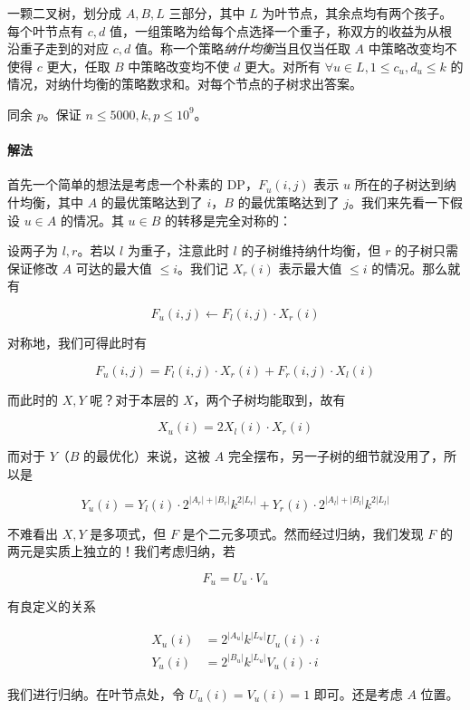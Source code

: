 \documentclass[12pt]{ctexart}
\theoremstyle{theorem}
\theoremstyle{theorem}
\begin{document}
一颗二叉树，划分成 $A,B,L$ 三部分，其中 $L$ 为叶节点，其余点均有两个孩子。每个叶节点有 $c,d$ 值，一组策略为给每个点选择一个重子，称双方的收益为从根沿重子走到的对应 $c,d$ 值。称一个策略\emph{纳什均衡}当且仅当任取 $A$ 中策略改变均不使得 $c$ 更大，任取 $B$ 中策略改变均不使 $d$ 更大。对所有 $\forall u\in L,1\le c_u,d_u\le k$ 的情况，对纳什均衡的策略数求和。对每个节点的子树求出答案。

同余 $p$。保证 $n\le 5000, k,p\le 10^9$。

\paragraph{解法}

首先一个简单的想法是考虑一个朴素的 DP，$F_u(i, j)$ 表示 $u$ 所在的子树达到纳什均衡，其中 $A$ 的最优策略达到了 $i$，$B$ 的最优策略达到了 $j$。我们来先看一下假设 $u\in A$ 的情况。其 $u\in B$ 的转移是完全对称的：

设两子为 $l, r$。若以 $l$ 为重子，注意此时 $l$ 的子树维持纳什均衡，但 $r$ 的子树只需保证修改 $A$ 可达的最大值 $\le i$。我们记 $X_r(i)$ 表示最大值 $\le i$ 的情况。那么就有

$$
F_u(i,j) \leftarrow F_l(i,j) \cdot X_r(i)
$$

对称地，我们可得此时有

$$
F_u(i,j) = F_l(i,j) \cdot X_r(i) + F_r(i,j) \cdot X_l(i)
$$

而此时的 $X,Y$ 呢？对于本层的 $X$，两个子树均能取到，故有

$$
X_u(i) = 2X_l(i)\cdot X_r(i)
$$

而对于 $Y$（$B$ 的最优化）来说，这被 $A$ 完全摆布，另一子树的细节就没用了，所以是

$$
Y_u(i) = Y_l(i) \cdot 2^{|A_r|+|B_r|}k^{2|L_r|} + Y_r(i) \cdot 2^{|A_l|+|B_l|}k^{2|L_l|}
$$

不难看出 $X,Y$ 是多项式，但 $F$ 是个二元多项式。然而经过归纳，我们发现 $F$ 的两元是实质上独立的！我们考虑归纳，若

$$
F_u = U_u \cdot V_u
$$

有良定义的关系

$$
\begin{aligned}
X_u(i) &= 2^{|A_u|} k^{|L_u|} U_u(i)\cdot i\\
Y_u(i) &= 2^{|B_u|} k^{|L_u|} V_u(i)\cdot i
\end{aligned}
$$

我们进行归纳。在叶节点处，令 $U_u(i)=V_u(i)=1$ 即可。还是考虑 $A$ 位置。
\end{document}

